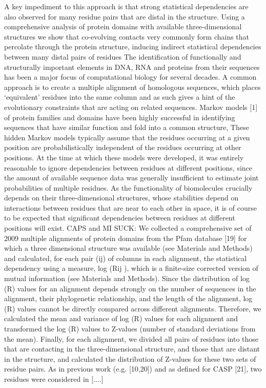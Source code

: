 A key impediment to this approach is that strong statistical dependencies are also observed for many residue pairs that are distal in the structure. \cite{burger2010disentangling}
Using a comprehensive analysis of protein domains with available three-dimensional structures we show that co-evolving contacts very commonly form chains that percolate through the protein structure, inducing indirect statistical dependencies between many distal pairs of residues \cite{burger2010disentangling}
The identification of functionally and structurally important elements in DNA, RNA and proteins from their sequences has been a major focus of computational biology for several decades. A common approach is to create a multiple alignment of homologous sequences, which places `equivalent' residues into the same column and as such gives a hint of the evolutionary constraints that are acting on related sequences. \cite{burger2010disentangling}
Markov models [1] of protein families and domains have been highly successful in identifying sequences that have similar function and fold into a common structure, \cite{burger2010disentangling}
These hidden Markov models typically assume that the residues occurring at a given position are probabilistically independent of the residues occurring at other positions. At the time at which these models were developed, it was entirely reasonable to ignore dependencies between residues at different positions, since the amount of available sequence data was generally insufficient to estimate joint probabilities of multiple residues. \cite{burger2010disentangling}
As the functionality of biomolecules crucially depends on their three-dimensional structures, whose stabilities depend on interactions between residues that are near to each other in space, it is of course to be expected that significant dependencies between residues at different positions will exist. \cite{burger2010disentangling}
CAPS and MI SUCK:  \cite{burger2010disentangling}
	We collected a comprehensive set of 2009 multiple alignments of protein domains from the Pfam database [19] for which a three dimensional structure was available (see Materials and Methods) and calculated, for each pair (ij) of columns in each alignment, the statistical dependency using a measure, log (Rij ), which is a finite-size corrected version of mutual information (see Materials and Methods). Since the distribution of log (R) values for an alignment depends strongly on the number of sequences in the alignment, their phylogenetic relationship, and the length of the alignment, log (R) values cannot be directly compared across different alignments. Therefore, we calculated the mean and variance of log (R) values for each alignment and transformed the log (R) values to Z-values (number of standard deviations from the mean). Finally, for each alignment, we divided all pairs of residues into those that are contacting in the three-dimensional structure, and those that are distant in the structure, and calculated the distribution of Z-values for these two sets of residue pairs. As in previous work (e.g. [10,20]) and as defined for CASP [21], two residues were considered in [....]  \cite{burger2010disentangling}
